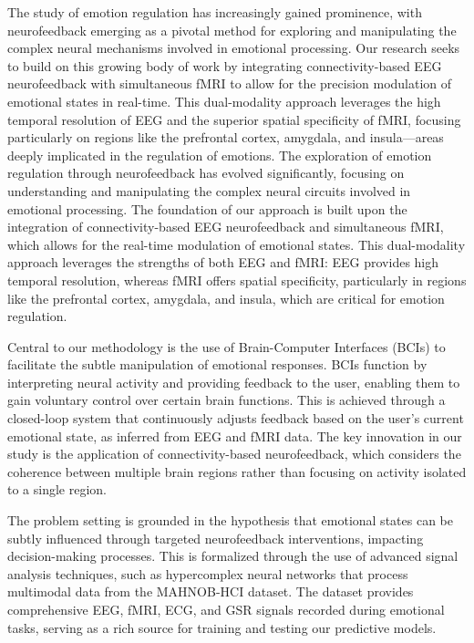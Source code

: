 \documentclass{article}
\begin{document}
The study of emotion regulation has increasingly gained prominence, with neurofeedback emerging as a pivotal method for exploring and manipulating the complex neural mechanisms involved in emotional processing. Our research seeks to build on this growing body of work by integrating connectivity-based EEG neurofeedback with simultaneous fMRI to allow for the precision modulation of emotional states in real-time. This dual-modality approach leverages the high temporal resolution of EEG and the superior spatial specificity of fMRI, focusing particularly on regions like the prefrontal cortex, amygdala, and insula—areas deeply implicated in the regulation of emotions.
The exploration of emotion regulation through neurofeedback has evolved significantly, focusing on understanding and manipulating the complex neural circuits involved in emotional processing. The foundation of our approach is built upon the integration of connectivity-based EEG neurofeedback and simultaneous fMRI, which allows for the real-time modulation of emotional states. This dual-modality approach leverages the strengths of both EEG and fMRI: EEG provides high temporal resolution, whereas fMRI offers spatial specificity, particularly in regions like the prefrontal cortex, amygdala, and insula, which are critical for emotion regulation.

Central to our methodology is the use of Brain-Computer Interfaces (BCIs) to facilitate the subtle manipulation of emotional responses. BCIs function by interpreting neural activity and providing feedback to the user, enabling them to gain voluntary control over certain brain functions. This is achieved through a closed-loop system that continuously adjusts feedback based on the user's current emotional state, as inferred from EEG and fMRI data. The key innovation in our study is the application of connectivity-based neurofeedback, which considers the coherence between multiple brain regions rather than focusing on activity isolated to a single region. 

The problem setting is grounded in the hypothesis that emotional states can be subtly influenced through targeted neurofeedback interventions, impacting decision-making processes. This is formalized through the use of advanced signal analysis techniques, such as hypercomplex neural networks that process multimodal data from the MAHNOB-HCI dataset. The dataset provides comprehensive EEG, fMRI, ECG, and GSR signals recorded during emotional tasks, serving as a rich source for training and testing our predictive models.
\end{document}
